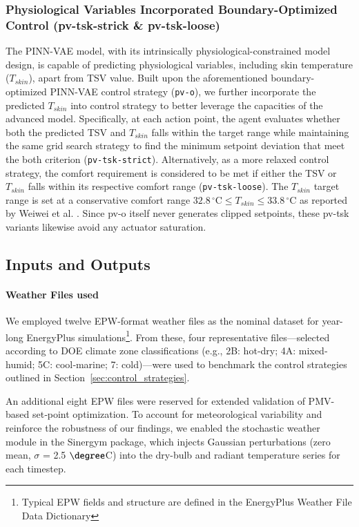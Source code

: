 \subsubsection{Physiological Variables Incorporated Boundary-Optimized Control (pv-tsk-strick \& pv-tsk-loose)}
\label{sec:pv_tsk_control}
The PINN-VAE model, with its intrinsically physiological-constrained model design, is capable of predicting physiological variables, including skin temperature ($T_{skin}$), apart from TSV value. Built upon the aforementioned boundary-optimized PINN-VAE control strategy (\texttt{pv-o}), we further incorporate the predicted $T_{skin}$ into control strategy to better leverage the capacities of the advanced model. Specifically, at each action point, the agent evaluates whether both the predicted TSV and $T_{skin}$ falls within the target range while maintaining the same grid search strategy to find the minimum setpoint deviation that meet the both criterion (\texttt{pv-tsk-strict}). Alternatively, as a more relaxed control strategy, the comfort requirement is considered to be met if either the TSV or $T_{skin}$ falls within its respective comfort range (\texttt{pv-tsk-loose}). The $T_{skin}$ target range is set at a conservative comfort range $32.8\,^\circ\mathrm{C} \leq T_{skin} \leq 33.8\,^\circ\mathrm{C}$ as reported by Weiwei et al. \cite{liuUseMeanSkin2015}. Since pv-o itself never generates clipped setpoints, these pv-tsk variants likewise avoid any actuator saturation.

\subsection{Inputs and Outputs}
\paragraph{Weather Files used}\label{sec:weather_noise}
We employed twelve EPW-format weather files as the nominal dataset for year-long EnergyPlus simulations\footnote{Typical EPW fields and structure are defined in the EnergyPlus Weather File Data Dictionary\cite{EPW_Data_Dictionary}}.  
From these, four representative files—selected according to DOE climate zone classifications (e.g., 2B: hot‐dry; 4A: mixed‐humid; 5C: cool‐marine; 7: cold)—were used to benchmark the control strategies outlined in Section~\ref{sec:control_strategies}.  

An additional eight EPW files were reserved for extended validation of PMV-based set‐point optimization. To account for meteorological variability and reinforce the robustness of our findings, we enabled the stochastic weather module in the Sinergym package, which injects Gaussian perturbations (zero mean, $\sigma$ = 2.5 $\degree$C) into the dry-bulb and radiant temperature series for each timestep\cite{Sinergym_Stochastic}.


